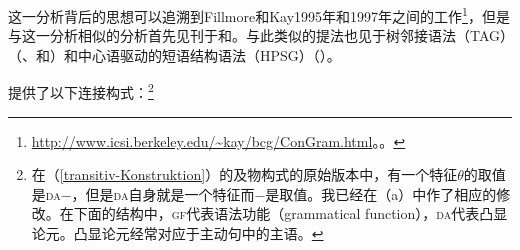 这一分析背后的思想可以追溯到Fillmore和Kay1995年和1997年之间的工作\footnote{
\url{http://www.icsi.berkeley.edu/~kay/bcg/ConGram.html}。。
}，但是与这一分析相似的分析首先见刊于和。与此类似的提法也见于树邻接语法\indextagc（TAG）（\citealp{Candito96a}、\citealp[]{CK2003a-u}和\citealp[--172]{KO2012a}）和中心语驱动的短语结构语法\indexhpsgc（HPSG）（\citealp{Koenig99a,DK2000b-u,Kordoni2001b-u}）。

\addlines[2]
\citet[--57]{MR2001a}提供了以下连接构式：\footnote{
	在（\ref{transitiv-Konstruktion}）的及物构式的原始版本中，有一个特征$\theta$的取值是\textsc{da}$-$，但是\textsc{da}自身就是一个特征而$-$是取值。我已经在（a）中作了相应的修改。在下面的结构中，\textsc{gf}代表语法功能（grammatical function），\textsc{da}代表凸显论元。凸显论元经常对应于主动句中的主语。}
	

